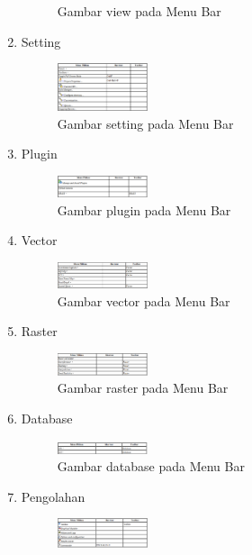 \begin{enumerate}
\begin{figure}[ht]
    \caption{Gambar view pada Menu Bar}
    \label{menubar2}
    \end{figure}
\item
Setting
\begin{figure}[ht]
    \centerline{\includegraphics[width=0.25\textwidth]{figures/menubar3}}
    \caption{Gambar setting pada Menu Bar}
    \label{menubar3}
    \end{figure}
\item
Plugin
\begin{figure}[ht]
    \centerline{\includegraphics[width=0.25\textwidth]{figures/menubar4}}
    \caption{Gambar plugin pada Menu Bar}
    \label{menubar4}
    \end{figure}
\item
Vector
\begin{figure}[ht]
    \centerline{\includegraphics[width=0.25\textwidth]{figures/menubar5}}
    \caption{Gambar vector pada Menu Bar}
    \label{menubar5}
    \end{figure}
\item
Raster
\begin{figure}[ht]
    \centerline{\includegraphics[width=0.25\textwidth]{figures/menubar6}}
    \caption{Gambar raster pada Menu Bar}
    \label{menubar6}
    \end{figure}
\item
Database
\begin{figure}[ht]
    \centerline{\includegraphics[width=0.25\textwidth]{figures/menubar7}}
    \caption{Gambar database pada Menu Bar}
    \label{menubar7}
    \end{figure}
\item
Pengolahan
\begin{figure}[ht]
    \centerline{\includegraphics[width=0.25\textwidth]{figures/menubar8}}

\end{figure}
\end{enumerate}

